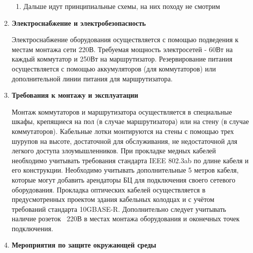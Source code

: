 \documentclass[a4paper,14pt]{extarticle}
\begin{document}
\begin{enumerate}
\begin{enumerate}
            \item Дальше идут принципиальные схемы, на них походу не смотрим
        \end{enumerate}
        \item \textbf{Электроснабжение и электробезопасность}\par
        Электроснабжение оборудования осуществляется с помощью подведения к местам монтажа сети 220В. Требуемая мощность электросетей - 
        60Вт на каждый коммутатор и 250Вт на маршрутизатор. Резервирование питания осуществляется с помощью аккумуляторов (для 
        коммутаторов) или дополнительной линии питания для маршрутизатора.
        \item \textbf{Требования к монтажу и эксплуатации}\par
        Монтаж коммутаторов и маршрутизатора осуществляется в специальные шкафы, крепящиеся на пол (в случае маршрутизатора) или на стену 
        (в случае коммутаторов). Кабельные лотки монтируются на стены с помощью трех шурупов на высоте, достаточной для обслуживания, не 
        недостаточной для легкого доступа злоумышленников. При прокладке медных кабелей необходимо учитывать требования стандарта IEEE 802.3ab 
        по длине кабеля и его конструкции. Необходимо учитывать дополнительные 5 метров кабеля, которые могут добавить арендаторы БЦ для 
        подключения своего сетевого оборудования. Прокладка оптических кабелей осуществляется в предусмотренных проектом здания кабельных колодцах 
        и с учётом требований стандарта 10GBASE-R. Дополнительно следует учитывать наличие розеток ~220В в местах монтажа оборудования и оконечных 
        точек подключения.
        \item \textbf{Мероприятия по защите окружающей среды}\par



    \end{enumerate}
\end{document}
